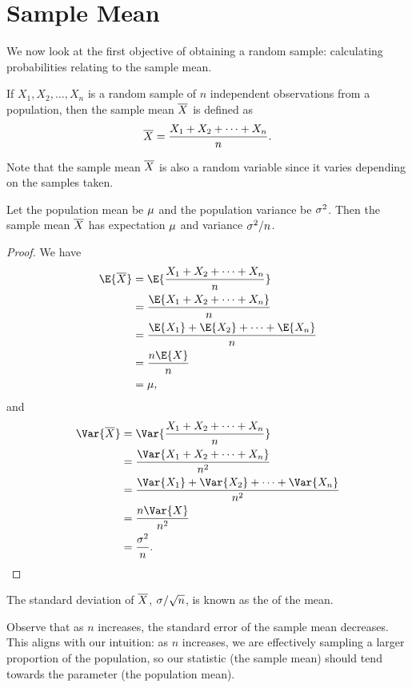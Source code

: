 \section{Sample Mean}

We now look at the first objective of obtaining a random sample: calculating probabilities relating to the sample mean.

\begin{definition}
    If $X_1, X_2, \dots, X_n$ is a random sample of $n$ independent observations from a population, then the sample mean $\overline{X}$ is defined as \[\overline{X} = \frac{X_1 + X_2 + \dots + X_n}{n}.\]
\end{definition}

Note that the sample mean $\overline{X}$ is also a random variable since it varies depending on the samples taken.

\begin{proposition}
    Let the population mean be $\mu$ and the population variance be $\sigma^2$. Then the sample mean $\overline{X}$ has expectation $\mu$ and variance $\sigma^2/n$.
\end{proposition}
\begin{proof}
    We have
    \begin{align*}
        \E{\ol{X}} &= \E{\frac{X_1 + X_2 + \dots + X_n}{n}}\\
        &= \frac{\E{X_1 + X_2 + \dots + X_n}}n\\
        &= \frac{\E{X_1} + \E{X_2} + \dots + \E{X_n}}n\\
        &= \frac{n \E{X}}n\\
        &= \m,
    \end{align*}
    and
    \begin{align*}
        \Var{\ol{X}} &= \Var{\frac{X_1 + X_2 + \dots + X_n}{n}}\\
        &= \frac{\Var{X_1 + X_2 + \dots + X_n}}{n^2} \\
        &= \frac{\Var{X_1} + \Var{X_2} + \dots + \Var{X_n}}{n^2}\\
        &= \frac{n \Var{X}}{n^2}\\
        &= \frac{\s^2}{n}.
    \end{align*}
\end{proof}

\begin{definition}
    The standard deviation of $\overline{X}$, $\sigma/\sqrt{n}$, is known as the  of the mean.
\end{definition}

Observe that as $n$ increases, the standard error of the sample mean decreases. This aligns with our intuition: as $n$ increases, we are effectively sampling a larger proportion of the population, so our statistic (the sample mean) should tend towards the parameter (the population mean).

